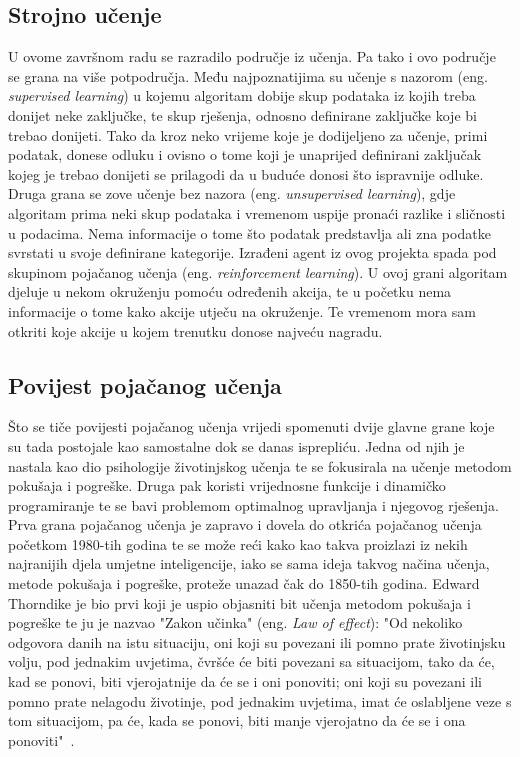 \subsection{Strojno učenje}
U ovome završnom radu se razradilo područje iz učenja. Pa tako i ovo područje se grana na više potpodručja. Među najpoznatijima su učenje s nazorom (eng. \textit{supervised learning}) u kojemu algoritam dobije skup podataka iz kojih treba donijet neke zaključke, te skup rješenja, odnosno definirane zaključke koje bi trebao donijeti. Tako da kroz neko vrijeme koje je dodijeljeno za učenje, primi podatak, donese odluku i ovisno 
o tome koji je unaprijed definirani zaključak kojeg je trebao donijeti se prilagodi da u buduće donosi što ispravnije odluke. Druga grana se zove učenje bez nazora (eng. \textit{unsupervised learning}), gdje algoritam prima neki skup podataka i vremenom uspije pronaći razlike i sličnosti u podacima. Nema informacije o tome što podatak predstavlja ali zna podatke svrstati u svoje definirane kategorije. Izrađeni agent iz ovog projekta spada pod skupinom pojačanog učenja (eng. \textit{reinforcement learning}). U ovoj grani algoritam djeluje u nekom okruženju pomoću određenih akcija, te u početku nema informacije o tome kako akcije utječu na okruženje. Te vremenom mora sam otkriti koje akcije u kojem trenutku donose najveću nagradu.


\subsection{Povijest pojačanog učenja}
Što se tiče povijesti pojačanog učenja vrijedi spomenuti dvije glavne grane koje su tada postojale kao samostalne dok se danas isprepliću. Jedna od njih je nastala kao dio psihologije životinjskog učenja te se fokusirala na učenje metodom pokušaja i pogreške. Druga pak koristi vrijednosne funkcije i dinamičko programiranje te se bavi problemom optimalnog upravljanja i njegovog rješenja. Prva grana pojačanog učenja je zapravo i dovela do otkrića pojačanog učenja početkom 1980-tih godina te se može reći kako kao takva proizlazi iz nekih najranijih djela umjetne inteligencije, iako se sama ideja takvog načina učenja, metode pokušaja i pogreške, proteže unazad čak do 1850-tih godina. Edward Thorndike je bio prvi koji je uspio objasniti bit učenja metodom pokušaja i pogreške te ju je nazvao "Zakon učinka" (eng. \textit{Law of effect}): "Od nekoliko odgovora danih na istu situaciju, oni koji su povezani ili pomno prate životinjsku volju, pod jednakim uvjetima, čvršće će biti povezani sa situacijom, tako da će, kad se ponovi, biti vjerojatnije da će se i oni ponoviti; oni koji su povezani ili pomno prate nelagodu životinje, pod jednakim uvjetima, imat će oslabljene veze s tom situacijom, pa će, kada se ponovi, biti manje vjerojatno da će se i ona ponoviti"~\cite{reinforcement_learning}.

